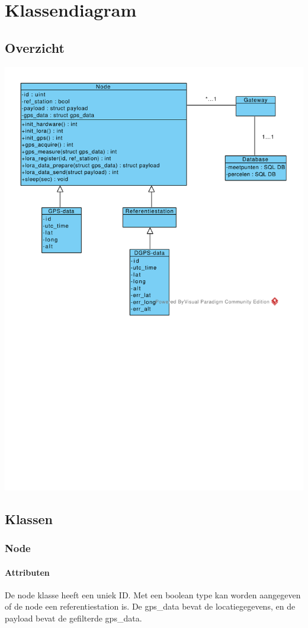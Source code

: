 \section{Klassendiagram}
\subsection{Overzicht}

\includegraphics[width=0.9\linewidth]{technical/class_diagram.pdf}

\subsection{Klassen}
\subsubsection{Node}
\paragraph{Attributen}
De node klasse heeft een uniek ID. Met een boolean type kan worden aangegeven of de node een referentiestation is. De gps\_data bevat de locatiegegevens, en de payload bevat de gefilterde gps\_data.

